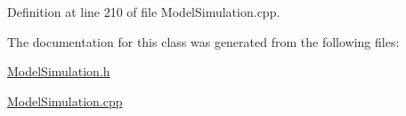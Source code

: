 Definition at line 210 of file Model\-Simulation.\-cpp.



The documentation for this class was generated from the following files\-:\begin{DoxyCompactItemize}
\item 
\hyperlink{_model_simulation_8h}{Model\-Simulation.\-h}\item 
\hyperlink{_model_simulation_8cpp}{Model\-Simulation.\-cpp}\end{DoxyCompactItemize}
